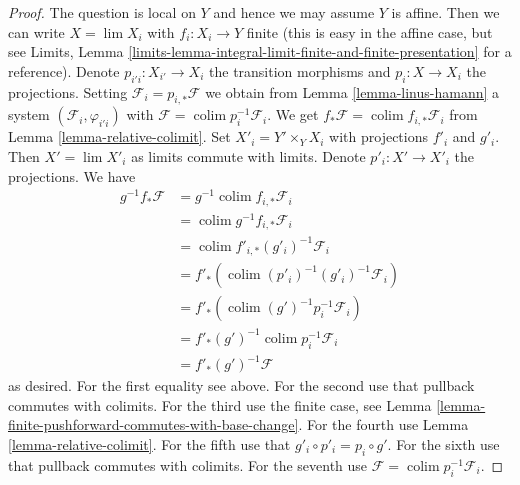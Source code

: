 \documentclass[10pt,a4paper]{amsart}
\theoremstyle{plain}
\theoremstyle{definition}
\theoremstyle{remark}
\numberwithin{equation}{subsection}
\def\lim{\mathop{\mathrm{lim}}\nolimits}
\def\colim{\mathop{\mathrm{colim}}\nolimits}
\begin{document}
\begin{proof}
The question is local on $Y$ and hence we may assume $Y$ is affine.
Then we can write $X = \lim X_i$ with $f_i : X_i \to Y$ finite
(this is easy in the affine case, but see
Limits, Lemma \ref{limits-lemma-integral-limit-finite-and-finite-presentation}
for a reference). Denote $p_{i'i} : X_{i'} \to X_i$
the transition morphisms and $p_i : X \to X_i$ the projections.
Setting $\mathcal{F}_i = p_{i, *}\mathcal{F}$ we obtain
from Lemma \ref{lemma-linus-hamann}
a system $(\mathcal{F}_i, \varphi_{i'i})$
with $\mathcal{F} = \colim p_i^{-1}\mathcal{F}_i$.
We get $f_*\mathcal{F} = \colim f_{i, *}\mathcal{F}_i$
from Lemma \ref{lemma-relative-colimit}.
Set $X'_i = Y' \times_Y X_i$ with projections $f'_i$ and $g'_i$.
Then $X' = \lim X'_i$ as limits commute with limits.
Denote $p'_i : X' \to X'_i$ the projections. We have
\begin{align*}
g^{-1}f_*\mathcal{F}
& =
g^{-1} \colim f_{i, *}\mathcal{F}_i \\
& =
\colim g^{-1}f_{i, *}\mathcal{F}_i \\
& =
\colim f'_{i, *}(g'_i)^{-1}\mathcal{F}_i \\
& =
f'_*(\colim (p'_i)^{-1}(g'_i)^{-1}\mathcal{F}_i) \\
& =
f'_*(\colim (g')^{-1}p_i^{-1}\mathcal{F}_i) \\
& =
f'_*(g')^{-1} \colim p_i^{-1}\mathcal{F}_i \\
& =
f'_*(g')^{-1}\mathcal{F}
\end{align*}
as desired. For the first equality see above.
For the second use that pullback commutes with colimits.
For the third use the finite case, see
Lemma \ref{lemma-finite-pushforward-commutes-with-base-change}.
For the fourth use Lemma \ref{lemma-relative-colimit}.
For the fifth use that $g'_i \circ p'_i = p_i \circ g'$.
For the sixth use that pullback commutes with colimits.
For the seventh use $\mathcal{F} = \colim p_i^{-1}\mathcal{F}_i$.
\end{proof}
\end{document}
